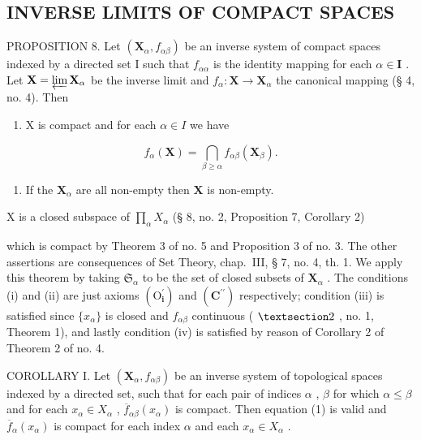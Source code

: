\subsection{INVERSE LIMITS OF COMPACT SPACES}

PROPOSITION 8. Let \((\mathbf{X}_{\alpha}, f_{\alpha \beta})\) be an inverse system of compact spaces indexed by a directed set I such that \(f_{\alpha \alpha}\) is the identity mapping for each \(\alpha \in \mathbf{I}\) . Let \(\mathbf{X} = \varprojlim \mathbf{X}_{\alpha}\) be the inverse limit and \(f_{\alpha}: \mathbf{X} \to \mathbf{X}_{\alpha}\) the canonical mapping (§ 4, no. 4). Then

\begin{enumerate}
\def\labelenumi{\alph{enumi})}
\tightlist
\item
  X is compact and for each \(\alpha \in I\) we have
\end{enumerate}

\[
f _ {\alpha} (\mathbf {X}) = \bigcap_ {\beta \geqslant \alpha} f _ {\alpha \beta} (\mathbf {X} _ {\beta}).\tag{I}
\]

\begin{enumerate}
\def\labelenumi{\alph{enumi})}
\setcounter{enumi}{1}
\tightlist
\item
  If the \(\mathbf{X}_{\alpha}\) are all non-empty then \(\mathbf{X}\) is non-empty.
\end{enumerate}

X is a closed subspace of \(\prod_{\alpha} X_{\alpha}\) (§ 8, no. 2, Proposition 7, Corollary 2)

which is compact by Theorem 3 of no. 5 and Proposition 3 of no. 3. The other assertions are consequences of Set Theory, chap.~III, § 7, no. 4, th. 1. We apply this theorem by taking \(\mathfrak{S}_{\alpha}\) to be the set of closed subsets of \(\mathbf{X}_{\alpha}\) . The conditions (i) and (ii) are just axioms \((\mathrm{O}_{\mathbf{i}}^{\prime})\) and \((\mathbf{C}^{\prime \prime})\) respectively; condition (iii) is satisfied since \(\{x_{\alpha}\}\) is closed and \(f_{\alpha \beta}\) continuous ( \(\S 2\) , no. 1, Theorem 1), and lastly condition (iv) is satisfied by reason of Corollary 2 of Theorem 2 of no. 4.

COROLLARY I. Let \((\mathbf{X}_{\alpha}, f_{\alpha\beta})\) be an inverse system of topological spaces indexed by a directed set, such that for each pair of indices \(\alpha\) , \(\beta\) for which \(\alpha \leqslant \beta\) and for each \(x_{\alpha} \in X_{\alpha}\) , \(\overline{f}_{\alpha\beta}(x_{\alpha})\) is compact. Then equation (1) is valid and \(\overline{f}_{\alpha}(x_{\alpha})\) is compact for each index \(\alpha\) and each \(x_{\alpha} \in X_{\alpha}\) .

